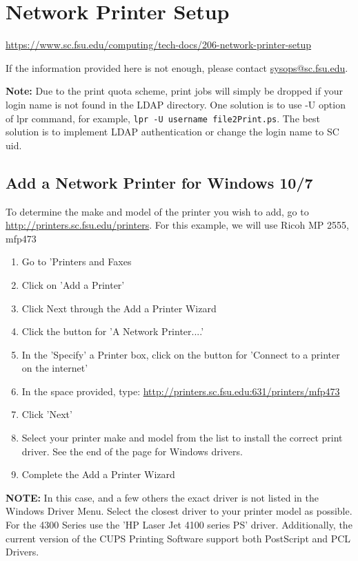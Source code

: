 \documentclass[12pt,a4paper]{article}
\begin{document}
\section{Network Printer Setup}
\url{https://www.sc.fsu.edu/computing/tech-docs/206-network-printer-setup}

If the information provided here is not enough, please contact \href{mailto:sysops@sc.fsu.edu}{sysops@sc.fsu.edu}.

\textbf{Note:} Due to the print quota scheme, print jobs will simply be dropped if your login name is not found in the LDAP directory. One solution is to use -U option of lpr command, for example, \texttt{lpr -U username file2Print.ps}. The best solution is to implement LDAP authentication or change the login name to SC uid.

\subsection*{Add a Network Printer for Windows 10/7}
To determine the make and model of the printer you wish to add, go to \url{http://printers.sc.fsu.edu/printers}.
For this example, we will use Ricoh MP 2555, mfp473
\begin{enumerate}
    \item Go to 'Printers and Faxes
    \item Click on 'Add a Printer'
    \item Click Next through the Add a Printer Wizard
    \item Click the button for 'A Network Printer....'
    \item In the 'Specify' a Printer box, click on the button for 'Connect to a printer on the internet'
    \item In the space provided, type: \url{http://printers.sc.fsu.edu:631/printers/mfp473}
    \item Click 'Next'
    \item Select your printer make and model from the list to install the correct print driver. See the end of the page for Windows drivers.
    \item Complete the Add a Printer Wizard
\end{enumerate}
\textbf{NOTE:} In this case, and a few others the exact driver is not listed in the Windows Driver Menu. Select the closest driver to your printer model as possible. For the 4300 Series use the 'HP Laser Jet 4100 series PS' driver. Additionally, the current version of the CUPS Printing Software support both PostScript and PCL Drivers.
\end{document}
